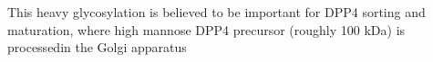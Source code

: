 This heavy glycosylation is believed to be important for DPP4 sorting and maturation, where high mannose DPP4 precursor (roughly 100 kDa) is processedin the Golgi apparatus \cite{Matter_1991}